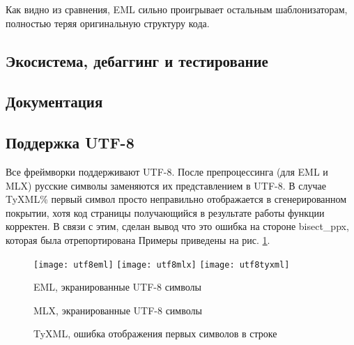Как видно из сравнения, EML сильно проигрывает остальным шаблонизаторам, полностью теряя оригинальную структуру кода.



\subsection{Экосистема, дебаггинг и тестирование}


\subsection{Документация}


\subsection{Поддержка UTF-8}

Все фреймворки поддерживают UTF-8.
После препроцессинга (для EML и MLX) русские символы заменяются их представлением в UTF-8.
В случае TyXML\% первый символ просто неправильно отображается в сгенерированном покрытии, хотя код страницы получающийся в результате работы функции корректен.
В связи с этим, сделан вывод что это ошибка на стороне bisect\_ppx, которая была отрепортирована %
Примеры приведены на рис. \ref{fig:utf8}.

\begin{figure}[ht!]
    \texttt{[image: utf8eml]}\hfill
    \texttt{[image: utf8mlx]}\hfill
    \texttt{[image: utf8tyxml]}
    \caption{EML, экранированные UTF-8 символы}
    \caption{MLX, экранированные UTF-8 символы}
    \caption{TyXML, ошибка отображения первых символов в строке}
    \label{fig:utf8}
\end{figure}
